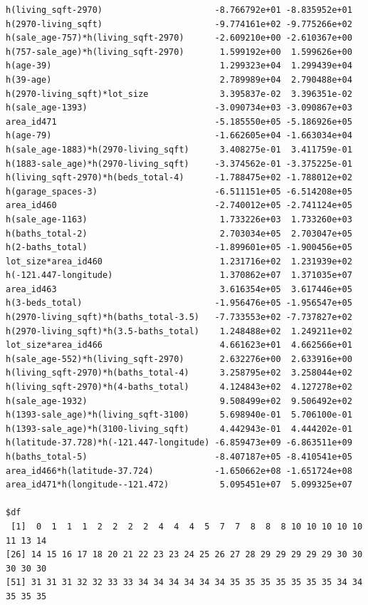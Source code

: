 \documentclass[
]{article}
\begin{document}
\begin{verbatim}
h(living_sqft-2970)                      -8.766792e+01 -8.835952e+01
h(2970-living_sqft)                      -9.774161e+02 -9.775266e+02
h(sale_age-757)*h(living_sqft-2970)      -2.609210e+00 -2.610367e+00
h(757-sale_age)*h(living_sqft-2970)       1.599192e+00  1.599626e+00
h(age-39)                                 1.299323e+04  1.299439e+04
h(39-age)                                 2.789989e+04  2.790488e+04
h(2970-living_sqft)*lot_size              3.395837e-02  3.396351e-02
h(sale_age-1393)                         -3.090734e+03 -3.090867e+03
area_id471                               -5.185550e+05 -5.186926e+05
h(age-79)                                -1.662605e+04 -1.663034e+04
h(sale_age-1883)*h(2970-living_sqft)      3.408275e-01  3.411759e-01
h(1883-sale_age)*h(2970-living_sqft)     -3.374562e-01 -3.375225e-01
h(living_sqft-2970)*h(beds_total-4)      -1.788475e+02 -1.788012e+02
h(garage_spaces-3)                       -6.511151e+05 -6.514208e+05
area_id460                               -2.740012e+05 -2.741124e+05
h(sale_age-1163)                          1.733226e+03  1.733260e+03
h(baths_total-2)                          2.703034e+05  2.703047e+05
h(2-baths_total)                         -1.899601e+05 -1.900456e+05
lot_size*area_id460                       1.231716e+02  1.231939e+02
h(-121.447-longitude)                     1.370862e+07  1.371035e+07
area_id463                                3.616354e+05  3.617446e+05
h(3-beds_total)                          -1.956476e+05 -1.956547e+05
h(2970-living_sqft)*h(baths_total-3.5)   -7.733553e+02 -7.737827e+02
h(2970-living_sqft)*h(3.5-baths_total)    1.248488e+02  1.249211e+02
lot_size*area_id466                       4.661623e+01  4.662566e+01
h(sale_age-552)*h(living_sqft-2970)       2.632276e+00  2.633916e+00
h(living_sqft-2970)*h(baths_total-4)      3.258795e+02  3.258044e+02
h(living_sqft-2970)*h(4-baths_total)      4.124843e+02  4.127278e+02
h(sale_age-1932)                          9.508499e+02  9.506492e+02
h(1393-sale_age)*h(living_sqft-3100)      5.698940e-01  5.706100e-01
h(1393-sale_age)*h(3100-living_sqft)      4.442943e-01  4.444202e-01
h(latitude-37.728)*h(-121.447-longitude) -6.859473e+09 -6.863511e+09
h(baths_total-5)                         -8.407187e+05 -8.410541e+05
area_id466*h(latitude-37.724)            -1.650662e+08 -1.651724e+08
area_id471*h(longitude--121.472)          5.095451e+07  5.099325e+07

$df
 [1]  0  1  1  1  2  2  2  2  4  4  4  5  7  7  8  8  8 10 10 10 10 10 11 13 14
[26] 14 15 16 17 18 20 21 22 23 23 24 25 26 27 28 29 29 29 29 29 30 30 30 30 30
[51] 31 31 31 32 32 33 33 34 34 34 34 34 34 35 35 35 35 35 35 35 34 34 35 35 35


\end{verbatim}
\end{document}
